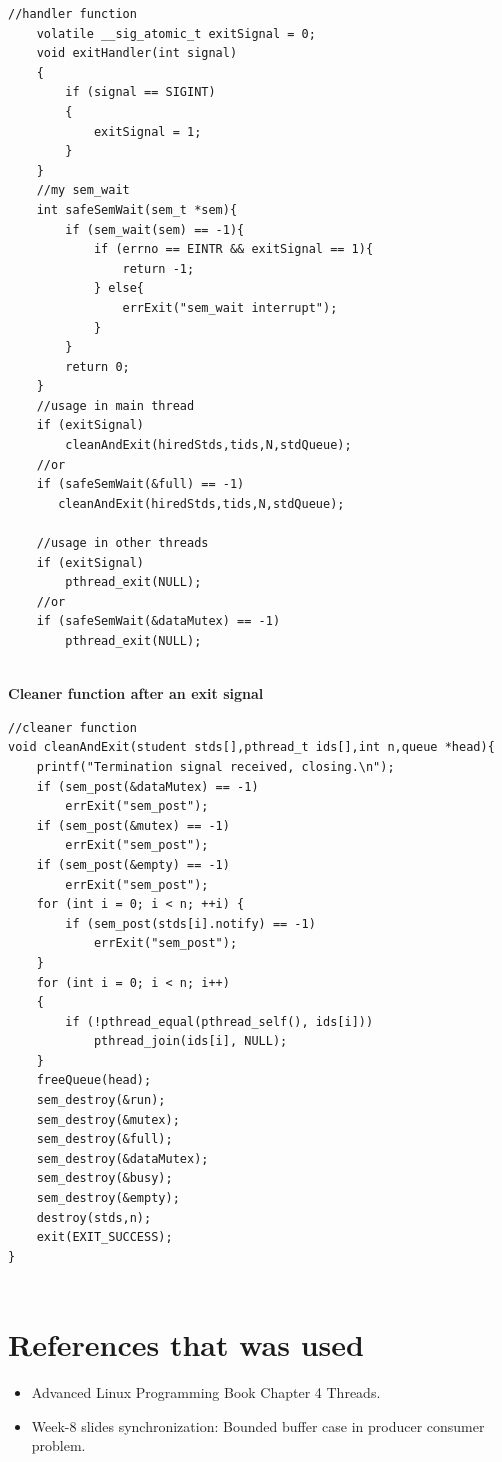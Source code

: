 \documentclass{article}
\begin{document}
\begin{lstlisting}[style=CStyle]
    //handler function
	volatile __sig_atomic_t exitSignal = 0;
	void exitHandler(int signal)
	{
    	if (signal == SIGINT)
    	{
        	exitSignal = 1;
    	}
	}
    //my sem_wait
	int safeSemWait(sem_t *sem){
    	if (sem_wait(sem) == -1){
        	if (errno == EINTR && exitSignal == 1){
           		return -1;
        	} else{
            	errExit("sem_wait interrupt");
        	}
    	}
    	return 0;
	}
	//usage in main thread
	if (exitSignal)
     	cleanAndExit(hiredStds,tids,N,stdQueue);
    //or
    if (safeSemWait(&full) == -1)
       cleanAndExit(hiredStds,tids,N,stdQueue);
       
    //usage in other threads
    if (exitSignal)
    	pthread_exit(NULL);
    //or
    if (safeSemWait(&dataMutex) == -1)
    	pthread_exit(NULL);
    
\end{lstlisting}
\textbf{Cleaner function after an exit signal}
\begin{lstlisting}[style=CStyle]
    //cleaner function
void cleanAndExit(student stds[],pthread_t ids[],int n,queue *head){
    printf("Termination signal received, closing.\n");
    if (sem_post(&dataMutex) == -1)
        errExit("sem_post");
    if (sem_post(&mutex) == -1)
        errExit("sem_post");
    if (sem_post(&empty) == -1)
        errExit("sem_post");
    for (int i = 0; i < n; ++i) {
        if (sem_post(stds[i].notify) == -1)
            errExit("sem_post");
    }
    for (int i = 0; i < n; i++)
    {
        if (!pthread_equal(pthread_self(), ids[i]))
            pthread_join(ids[i], NULL);
    }
    freeQueue(head);
    sem_destroy(&run);
    sem_destroy(&mutex);
    sem_destroy(&full);
    sem_destroy(&dataMutex);
    sem_destroy(&busy);
    sem_destroy(&empty);
    destroy(stds,n);
    exit(EXIT_SUCCESS);
}
    
\end{lstlisting}
\section{References that was used} 
\begin{itemize}
	\item Advanced Linux Programming Book Chapter 4 Threads.
	\item Week-8 slides synchronization: Bounded buffer case in producer consumer problem.
\end{itemize}
\cleardoublepage
\end{document}

